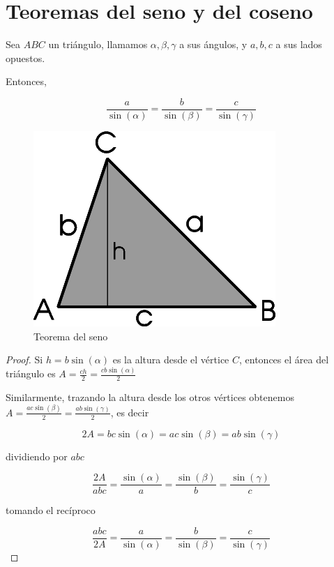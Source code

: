 \section{Teoremas del seno y del coseno}

\begin{theorem} \label{teorema_del_seno}

Sea $ABC$ un triángulo, llamamos $\alpha, \beta, \gamma$ a sus ángulos, y $a,b,c$ a sus lados opuestos.

Entonces,

$$ \boxed{ \frac{a}{\sin(\alpha)} = \frac{b}{\sin(\beta)} = \frac{c}{\sin(\gamma)} } $$

\end{theorem}

\begin{figure}[h]
\centering\includegraphics[scale=0.4]{images/01_precalculo/teorema_seno.png}
\caption{Teorema del seno}
\end{figure}

\begin{proof}
Si $h = b \sin(\alpha)$ es la altura desde el vértice $C$, entonces el área del triángulo es $A = \frac{ch}{2} = \frac{c b \sin(\alpha)}{2}$

Similarmente, trazando la altura desde los otros vértices obtenemos $A = \frac{ac \sin(\beta)}{2} = \frac{ab \sin(\gamma)}{2}$, es decir

$$ 2A = bc \sin(\alpha) = ac \sin(\beta) = ab \sin(\gamma) $$

dividiendo por $abc$

$$ \frac{2A}{abc} = \frac{\sin(\alpha)}{a} = \frac{\sin(\beta)}{b} = \frac{\sin(\gamma)}{c} $$

tomando el recíproco

$$ \frac{abc}{2A} = \frac{a}{\sin(\alpha)} = \frac{b}{\sin(\beta)} = \frac{c}{\sin(\gamma)} $$
\end{proof}

